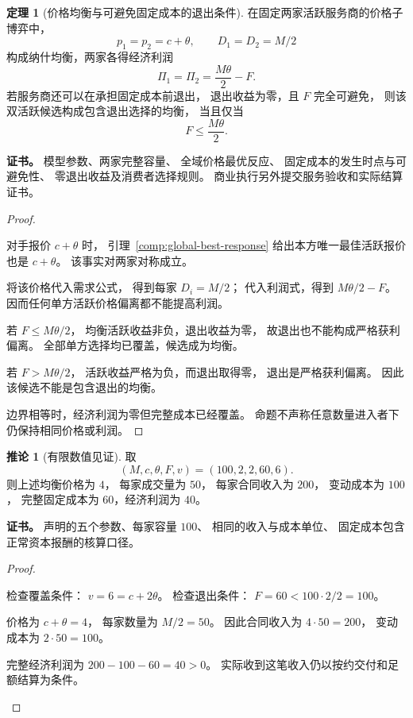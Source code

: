 \documentclass[UTF8,12pt,a4paper,openany,fontset=none,zihao=false]{ctexrep}
\theoremstyle{definition}
\newtheorem{theorem}{定理}[chapter]
\newtheorem{corollary}{推论}[chapter]
\newenvironment{certificate}{\par\noindent\textbf{证书。}\ignorespaces}{\par}
\newcommand{\1}{\mathbf 1}
\begin{document}
\begin{theorem}[价格均衡与可避免固定成本的退出条件]
\label{comp:hotelling-equilibrium}
在固定两家活跃服务商的价格子博弈中，
\[
 p_1=p_2=c+\theta,\qquad D_1=D_2=M/2
\]
构成纳什均衡，两家各得经济利润
\[
 \Pi_1=\Pi_2=\frac{M\theta}{2}-F.
\]
若服务商还可以在承担固定成本前退出，
退出收益为零，且 \(F\) 完全可避免，
则该双活跃候选构成包含退出选择的均衡，
当且仅当
\[
 F\le\frac{M\theta}{2}.
\]
\end{theorem}
\begin{certificate}
模型参数、两家完整容量、
全域价格最优反应、
固定成本的发生时点与可避免性、
零退出收益及消费者选择规则。
商业执行另外提交服务验收和实际结算证书。
\end{certificate}
\begin{proof}
\begin{semanticsteps}
\item 对手报价 \(c+\theta\) 时，
引理~\ref{comp:global-best-response}
给出本方唯一最佳活跃报价也是 \(c+\theta\)。
该事实对两家对称成立。
\item 将该价格代入需求公式，
得到每家 \(D_i=M/2\)；
代入利润式，得到 \(M\theta/2-F\)。
因而任何单方活跃价格偏离都不能提高利润。
\item 若 \(F\le M\theta/2\)，
均衡活跃收益非负，退出收益为零，
故退出也不能构成严格获利偏离。
全部单方选择均已覆盖，候选成为均衡。
\item 若 \(F>M\theta/2\)，
活跃收益严格为负，而退出取得零，
退出是严格获利偏离。
因此该候选不能是包含退出的均衡。
\end{semanticsteps}
边界相等时，经济利润为零但完整成本已经覆盖。
命题不声称任意数量进入者下仍保持相同价格或利润。
\end{proof}

\begin{corollary}[有限数值见证]
\label{comp:numeric}
取
\[
 (M,c,\theta,F,v)=(100,2,2,60,6).
\]
则上述均衡价格为 \(4\)，
每家成交量为 \(50\)，
每家合同收入为 \(200\)，
变动成本为 \(100\)，
完整固定成本为 \(60\)，经济利润为 \(40\)。
\end{corollary}
\begin{certificate}
声明的五个参数、每家容量 \(100\)、
相同的收入与成本单位、
固定成本包含正常资本报酬的核算口径。
\end{certificate}
\begin{proof}
\begin{semanticsteps}
\item 检查覆盖条件：
\(v=6=c+2\theta\)。
检查退出条件：
\(F=60<100\cdot2/2=100\)。
\item 价格为 \(c+\theta=4\)，
每家数量为 \(M/2=50\)。
因此合同收入为 \(4\cdot50=200\)，
变动成本为 \(2\cdot50=100\)。
\item 完整经济利润为
\(200-100-60=40>0\)。
实际收到这笔收入仍以按约交付和足额结算为条件。
\end{semanticsteps}
\end{proof}
\end{document}
